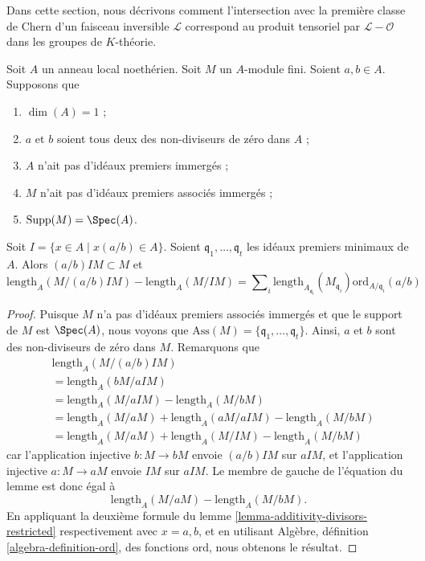 \noindent
Dans cette section, nous décrivons comment l'intersection avec la
première classe de Chern d'un faisceau inversible $\mathcal{L}$
correspond au produit tensoriel par $\mathcal{L} - \mathcal{O}$
dans les groupes de $K$-théorie.

\begin{lemma}
\label{lemma-no-embedded-points-modules}
Soit $A$ un anneau local noethérien.
Soit $M$ un $A$-module fini.
Soient $a, b \in A$.
Supposons que
\begin{enumerate}
\item $\dim(A) = 1$ ;
\item $a$ et $b$ soient tous deux des non-diviseurs de zéro dans $A$ ;
\item $A$ n'ait pas d'idéaux premiers immergés ;
\item $M$ n'ait pas d'idéaux premiers associés immergés ;
\item $\text{Supp}(M) = \Spec(A)$.
\end{enumerate}
Soit $I = \{x \in A \mid x(a/b) \in A\}$.
Soient $\mathfrak q_1, \ldots, \mathfrak q_t$ les idéaux premiers minimaux
de $A$. Alors $(a/b)IM \subset M$ et
$$
\text{length}_A(M/(a/b)IM)
-
\text{length}_A(M/IM)
=
\sum\nolimits_i
\text{length}_{A_{\mathfrak q_i}}(M_{\mathfrak q_i})
\text{ord}_{A/\mathfrak q_i}(a/b)
$$
\end{lemma}

\begin{proof}
Puisque $M$ n'a pas d'idéaux premiers associés immergés et que
le support de $M$ est $\Spec(A)$, nous voyons que
$\text{Ass}(M) = \{\mathfrak q_1, \ldots, \mathfrak q_t\}$.
Ainsi, $a$ et $b$ sont des non-diviseurs de zéro dans $M$. Remarquons que
\begin{align*}
& \text{length}_A(M/(a/b)IM) \\
& = \text{length}_A(bM/aIM) \\
& = \text{length}_A(M/aIM)
-
\text{length}_A(M/bM) \\
& = \text{length}_A(M/aM) + \text{length}_A(aM/aIM) - \text{length}_A(M/bM) \\
& = \text{length}_A(M/aM) + \text{length}_A(M/IM) - \text{length}_A(M/bM)
\end{align*}
car l'application injective $b : M \to bM$ envoie $(a/b)IM$ sur $aIM$,
et l'application injective $a : M \to aM$ envoie $IM$ sur $aIM$.
Le membre de gauche de l'équation du lemme est donc
égal à
$$
\text{length}_A(M/aM) - \text{length}_A(M/bM).
$$
En appliquant la deuxième formule du
lemme \ref{lemma-additivity-divisors-restricted}
respectivement avec $x = a, b$,
et en utilisant Algèbre, définition \ref{algebra-definition-ord},
des fonctions $\text{ord}$, nous obtenons le résultat.
\end{proof}

